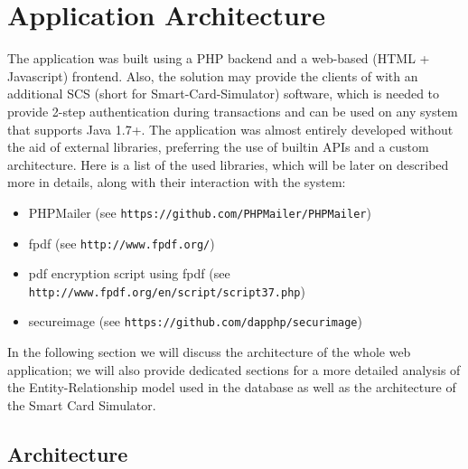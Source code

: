 \chapter{Application Architecture}\label{chapter:application_architecture}
The \gnb{} application was built using a PHP backend and a web-based (HTML + Javascript) frontend. Also, the solution may provide the clients of \gnb{} with an additional SCS (short for Smart-Card-Simulator) software, which is needed to provide 2-step authentication during transactions and can be used on any system that supports Java 1.7+.\newline
The application was almost entirely developed without the aid of external libraries, preferring the use of builtin APIs and a custom architecture. Here is a list of the used libraries, which will be later on described more in details, along with their interaction with the system:
\begin{itemize}
	\item PHPMailer (see \texttt{https://github.com/PHPMailer/PHPMailer})
	\item fpdf (see \texttt{http://www.fpdf.org/})
	\item pdf encryption script using fpdf (see \texttt{http://www.fpdf.org/en/script/script37.php})
	\item secureimage (see \texttt{https://github.com/dapphp/securimage})
\end{itemize}

In the following section we will discuss the architecture of the whole web application; we will also provide dedicated sections for a more detailed analysis of the Entity-Relationship model used in the database as well as the architecture of the Smart Card Simulator.
\section{Architecture}

